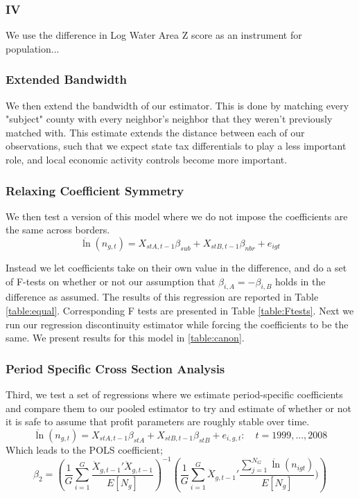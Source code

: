 \subsubsection{IV}

We use the difference in Log Water Area Z score as an instrument for population...

\subsubsection{Extended Bandwidth}

We then extend the bandwidth of our estimator. This is done by matching every "subject" county with every neighbor's neighbor that they weren't previously matched with. This estimate extends the distance between each of our observations, such that we expect state tax differentials to play a less important role, and local economic activity controls become more important.

\subsubsection{Relaxing Coefficient Symmetry}
We then test a version of this model where we do not impose the coefficients are the same across borders.
\begin{equation}\label{sense1}
\ddot \ln(n_{g,t}) = X_{stA,t-1}\beta_{sub}+X_{stB,t-1}\beta_{nbr}+ e_{igt} 
\end{equation}

Instead we let coefficients take on their own value in the difference, and do a set of F-tests on whether or not our assumption that $\beta_{i,A} = -\beta_{i,B}$ holds in the difference as assumed. The results of this regression are reported in Table \ref{table:equal}. Corresponding F tests are presented in Table \ref{table:Ftests}. Next we run our regression discontinuity estimator while forcing the coefficients to be the same. We present results for this model in \ref{table:canon}.

\subsubsection{Period Specific Cross Section Analysis}
Third, we test a set of regressions where we estimate period-specific coefficients and compare them to our pooled estimator to try and estimate of whether or not it is safe to assume that profit parameters are roughly stable over time. 
\begin{equation}\label{sense2}
\ddot \ln(n_{g,t})  = X_{stA,t-1}\beta_{stA}+X_{stB,t-1}\beta_{stB}+ e_{i,g,t}: \quad t = 1999,...,2008
\end{equation}
Which leads to the POLS coefficient;
\begin{equation}
\hat \beta_{2} = \left(\frac{1}{G}\sum_{i=1}^{G}\frac{\ddot X_{g,t-1}'\ddot X_{g,t-1}}{E[N_{g}]}\right)^{-1}\left(\frac{1}{G}\sum_{i=1}^{G}\ddot X_{g,t-1}'\frac{\sum_{j=1}^{N_{G}}\ddot \ln(n_{igt})}{E[N_{g}]})\right)
\end{equation}

